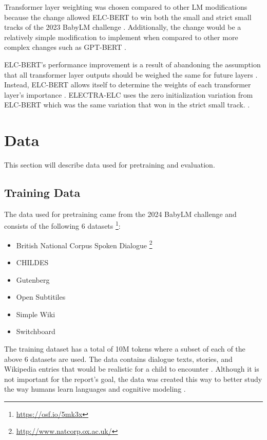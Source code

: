 \documentclass[11pt]{article}
\begin{document}
Transformer layer weighting was chosen compared to other LM modifications because the change
allowed ELC-BERT to win both the small and strict small tracks of the 2023 BabyLM
challenge \cite{charpentier2023layersequallyimportantlayer}. Additionally, the change
would be a relatively simple modification to implement when compared to other more complex
changes such as GPT-BERT \cite{charpentier2024gptbertboth}. 

ELC-BERT's performance improvement is a result of abandoning the assumption that all
transformer layer outputs should be weighed the same for future layers \cite{charpentier2023layersequallyimportantlayer}. Instead, ELC-BERT allows itself to 
determine the weights of each transformer layer's importance \cite{charpentier2023layersequallyimportantlayer}. ELECTRA-ELC uses the zero initialization
variation from ELC-BERT which was the same variation that won in the strict small track. \cite{charpentier2023layersequallyimportantlayer}.


\section{Data}

This section will describe data used for pretraining and evaluation.

\subsection{Training Data}

The data used for pretraining came from the 2024 BabyLM challenge and consists of the following 6 datasets \footnote{\url{https://osf.io/5mk3x}}:
\begin{itemize}
    \item British National Corpus Spoken Dialogue \footnote{\url{http://www.natcorp.ox.ac.uk/}}
    \item CHILDES \cite{childes}
    \item Gutenberg \cite{gerlach2018standardizedprojectgutenbergcorpus}
    \item Open Subtitiles \cite{lison-tiedemann-2016-opensubtitles2016}
    \item Simple Wiki
    \item Switchboard \cite{stolcke-etal-2000-dialogue}
\end{itemize}
The training dataset has a total of 10M tokens where a subset of each of the above 6
datasets are used. The data contains dialogue texts, 
stories, and Wikipedia entries that would be realistic for a child to encounter \cite{warstadt2023papersbabylmchallenge}. Although it is not important
for the report's goal, the data was created this way to better study the way
humans learn languages and cognitive modeling \cite{warstadt2023papersbabylmchallenge}.
\end{document}
